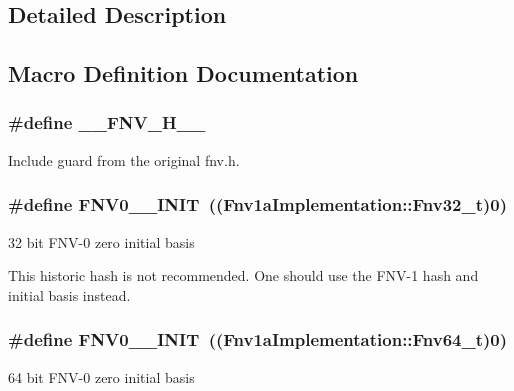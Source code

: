 \subsection{Detailed Description}


\subsection{Macro Definition Documentation}
\subsubsection[{\texorpdfstring{\+\_\+\+\_\+\+F\+N\+V\+\_\+\+H\+\_\+\+\_\+}{__FNV_H__}}]{\setlength{\rightskip}{0pt plus 5cm}\#define \+\_\+\+\_\+\+F\+N\+V\+\_\+\+H\+\_\+\+\_\+}\hypertarget{group__hash__fnv_gac8e163567fdac1fd24f2871819172457}{}\label{group__hash__fnv_gac8e163567fdac1fd24f2871819172457}
Include guard from the original fnv.\+h. 
\subsubsection[{\texorpdfstring{F\+N\+V0\+\_\+32\+\_\+\+I\+N\+IT}{FNV0_32_INIT}}]{\setlength{\rightskip}{0pt plus 5cm}\#define F\+N\+V0\+\_\+\_\+\+I\+N\+IT~((Fnv1a\+Implementation\+::\+Fnv32\+\_\+t)0)}\hypertarget{group__hash__fnv_ga059b80066b559fcc2869a8679f2abd3a}{}\label{group__hash__fnv_ga059b80066b559fcc2869a8679f2abd3a}
32 bit F\+N\+V-\/0 zero initial basis

This historic hash is not recommended. One should use the F\+N\+V-\/1 hash and initial basis instead. 
\subsubsection[{\texorpdfstring{F\+N\+V0\+\_\+64\+\_\+\+I\+N\+IT}{FNV0_64_INIT}}]{\setlength{\rightskip}{0pt plus 5cm}\#define F\+N\+V0\+\_\+\_\+\+I\+N\+IT~((Fnv1a\+Implementation\+::\+Fnv64\+\_\+t)0)}\hypertarget{group__hash__fnv_gacb9cb4b59bd9db3a5d335369fa58032a}{}\label{group__hash__fnv_gacb9cb4b59bd9db3a5d335369fa58032a}
64 bit F\+N\+V-\/0 zero initial basis

